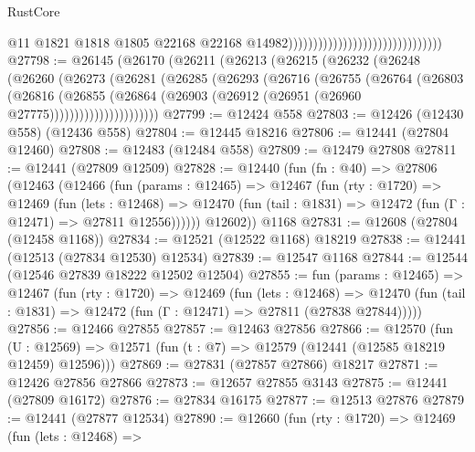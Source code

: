 \begin{lexlean}{RustCore}
\begin{coremodule}
                                                                  @11
                                                                  @1821
                                                                  @1818
                                                                  @1805
                                                                  @22168
                                                                  @22168
                                                                  @14982)))))))))))))))))))))))))))))))
@27798 := @26145
    (@26170
      (@26211
        (@26213
          (@26215
            (@26232
              (@26248
                (@26260
                  (@26273
                    (@26281
                      (@26285
                        (@26293
                          (@26716
                            (@26755
                              (@26764
                                (@26803
                                  (@26816
                                    (@26855
                                      (@26864
                                        (@26903 (@26912 (@26951 (@26960 @27775))))))))))))))))))))))
@27799 := @12424 @558
@27803 := @12426 (@12430 @558) (@12436 @558)
@27804 := @12445 @18216
@27806 := @12441 (@27804 @12460)
@27808 := @12483 (@12484 @558)
@27809 := @12479 @27808
@27811 := @12441 (@27809 @12509)
@27828 := @12440
    (fun (fn : @40) =>
    @27806
      (@12463
        (@12466
          (fun (params : @12465) =>
          @12467
            (fun (rty : @1720) =>
            @12469
              (fun (lets : @12468) =>
              @12470 (fun (tail : @1831) => @12472 (fun (Γ : @12471) => @27811 @12556))))))
        @12602))
    @1168
@27831 := @12608 (@27804 (@12458 @1168))
@27834 := @12521 (@12522 @1168) @18219
@27838 := @12441 (@12513 (@27834 @12530) @12534)
@27839 := @12547 @1168
@27844 := @12544 (@12546 @27839 @18222 @12502 @12504)
@27855 := fun (params : @12465) =>
  @12467
    (fun (rty : @1720) =>
    @12469
      (fun (lets : @12468) =>
      @12470 (fun (tail : @1831) => @12472 (fun (Γ : @12471) => @27811 (@27838 @27844)))))
@27856 := @12466 @27855
@27857 := @12463 @27856
@27866 := @12570
    (fun (U : @12569) => @12571 (fun (t : @7) => @12579 (@12441 (@12585 @18219 @12459) @12596)))
@27869 := @27831 (@27857 @27866) @18217
@27871 := @12426 @27856 @27866
@27873 := @12657 @27855 @3143
@27875 := @12441 (@27809 @16172)
@27876 := @27834 @16175
@27877 := @12513 @27876
@27879 := @12441 (@27877 @12534)
@27890 := @12660
    (fun (rty : @1720) =>
    @12469
      (fun (lets : @12468) =>

\end{coremodule}
\end{lexlean}
